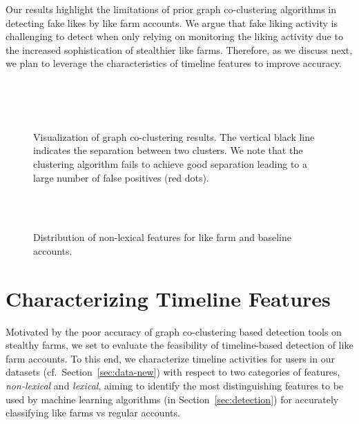 \documentclass[twocolumn,10pt,letterpaper]{article}
\begin{document}
Our results highlight the limitations of prior graph co-clustering algorithms in detecting fake likes by like farm accounts. We argue that fake liking activity is challenging to detect when only relying on monitoring the liking activity due to the increased sophistication of stealthier like farms. Therefore, as we discuss next, we plan to leverage the characteristics of timeline features to improve accuracy.
%
\begin{figure*}[p]
\centering
{}
~
\\
~
\\
~
\vspace{0.2cm}
\caption{Visualization of graph co-clustering results. The vertical black line indicates the separation between two clusters. We note that the clustering algorithm fails to achieve good separation leading to a large number of false positives (red dots).}
\label{fig: clustering results}
%
\end{figure*}

\begin{figure*}[t]
	\centering
{}
%
%
%
%
~\hspace{-0.2cm}
%
%
%
%
%
\\
%
%
%
%
%
~\hspace{-0.2cm}
%
%
%
%
%
%
\vspace{-0.15cm}
\caption{Distribution of non-lexical features for like farm and baseline accounts.}
%
\end{figure*}


\section{Characterizing Timeline Features}
\label{sec:characterizing}
%
Motivated by the poor accuracy of graph co-clustering based detection tools on stealthy farms, we set to evaluate the feasibility of timeline-based detection of like farm accounts. To this end, we characterize timeline activities for users in our datasets (cf.~Section~\ref{sec:data-new}) with respect to two categories of features, {\em non-lexical} and {\em lexical}, aiming to identify the most distinguishing features to be used by machine learning algorithms (in Section~\ref{sec:detection}) for accurately classifying like farms vs regular accounts.
\end{document}
